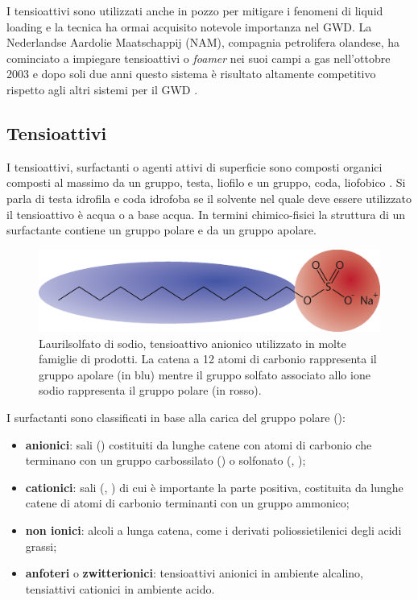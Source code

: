 I tensioattivi sono utilizzati anche in pozzo per mitigare i fenomeni di liquid loading e la tecnica ha ormai acquisito notevole importanza nel GWD. La Nederlandse Aardolie Maatschappij (NAM), compagnia petrolifera olandese, 
ha cominciato a impiegare tensioattivi o \textit{foamer} nei suoi campi a gas nell'ottobre 2003  e dopo soli due anni questo sistema è risultato altamente competitivo rispetto agli altri sistemi per il GWD \parencite{wittfeld2015foam}. 

\subsection{Tensioattivi}
I tensioattivi, surfactanti o agenti attivi di superficie sono composti organici composti al massimo da un gruppo, testa, liofilo e un gruppo, coda, liofobico . Si parla di testa idrofila e coda idrofoba se il solvente nel quale deve essere utilizzato il tensioattivo è acqua o a base acqua. In termini chimico-fisici la struttura di un surfactante contiene un gruppo polare e da un gruppo apolare.

\begin{figure}[htbp]
    \centering
    \includegraphics[width=.5\textwidth]{fig/foamer/sls.eps}
    \caption{Laurilsolfato di sodio, tensioattivo anionico utilizzato in molte famiglie di prodotti. La catena a 12 atomi di carbonio rappresenta il gruppo apolare (in blu) mentre il gruppo solfato associato allo ione sodio rappresenta il gruppo polare (in rosso).}
    \label{fig:sls}
\end{figure}

I surfactanti sono classificati in base alla carica del gruppo polare ():
\begin{itemize}
    \item \textbf{anionici}: sali () costituiti da lunghe catene con atomi di carbonio che terminano con un gruppo carbossilato ()  o solfonato (, );
    \item \textbf{cationici}: sali (, ) di cui è importante la parte positiva, costituita da lunghe catene di atomi di carbonio terminanti con un gruppo ammonico;
    \item \textbf{non ionici}: alcoli a lunga catena, come i derivati poliossietilenici degli acidi grassi;
    \item \textbf{anfoteri} o \textbf{zwitterionici}: tensioattivi anionici in ambiente alcalino, tensiattivi cationici in ambiente acido.
\end{itemize}


